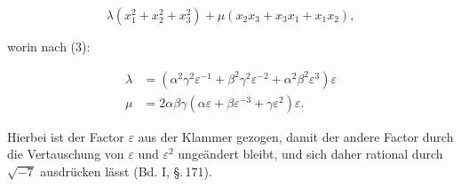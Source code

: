 \[
\lambda(x_1^2+x_2^2+x_3^2) + \mu(x_2x_3+x_3x_1+x_1x_2),
\]

worin nach (3):

\[
\begin{aligned}
\lambda &= (\alpha^2\gamma^2\varepsilon^{-1} + \beta^2\gamma^2\varepsilon^{-2} + \alpha^2\beta^2\varepsilon^3)\varepsilon \\
\mu &= 2\alpha\beta\gamma(\alpha\varepsilon+\beta\varepsilon^{-3}+\gamma\varepsilon^2)\varepsilon.
\end{aligned}
\]

Hierbei ist der Factor $\varepsilon$ aus der Klammer gezogen, damit der andere Factor durch die Vertauschung von $\varepsilon$ und $\varepsilon^2$ ungeändert bleibt, und sich daher rational durch $\sqrt{-7}$ ausdrücken l\"asst (Bd. I, \S.\,171).
